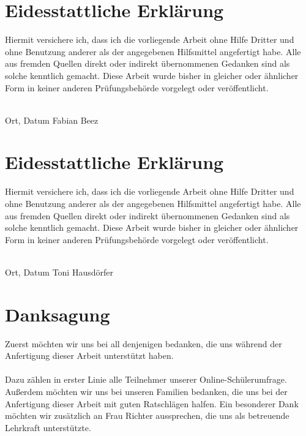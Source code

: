 \documentclass[a4paper, 12pt]{scrartcl}
\begin{document}
\newpage




\vspace*{4cm}
\section*{Eidesstattliche Erklärung}
\vfill
Hiermit versichere ich, dass ich die vorliegende Arbeit
ohne Hilfe Dritter und ohne Benutzung anderer als der angegebenen
Hilfsmittel angefertigt habe. Alle aus fremden Quellen direkt oder
indirekt übernommenen Gedanken sind als solche kenntlich gemacht. Diese
Arbeit wurde bisher in gleicher oder ähnlicher Form in keiner anderen
Prüfungsbehörde vorgelegt oder veröffentlicht.

\vfill
\noindent\dotfill\\
\hspace{2cm} Ort, Datum \hfill Fabian Beez
\vfill
\vfill\vfill\vfill\vfill\vfill
\newpage




\vspace*{4cm}
\section*{Eidesstattliche Erklärung}
\vfill
Hiermit versichere ich, dass ich die vorliegende Arbeit
ohne Hilfe Dritter und ohne Benutzung anderer als der angegebenen
Hilfsmittel angefertigt habe. Alle aus fremden Quellen direkt oder
indirekt übernommenen Gedanken sind als solche kenntlich gemacht. Diese
Arbeit wurde bisher in gleicher oder ähnlicher Form in keiner anderen
Prüfungsbehörde vorgelegt oder veröffentlicht.

\vfill
\noindent\dotfill\\
\hspace{2cm} Ort, Datum \hfill Toni Hausdörfer
\vfill
\vfill\vfill\vfill\vfill\vfill
\newpage






 
\vspace*{5cm}
\section*{Danksagung}
\vspace{1.7cm}
Zuerst möchten wir uns bei all denjenigen bedanken, die uns während der Anfertigung dieser Arbeit unterstützt haben. \\\\
Dazu zählen in erster Linie alle Teilnehmer unserer Online-Schülerumfrage. 
Außerdem möchten wir uns bei unseren Familien bedanken, die uns bei der Anfertigung dieser Arbeit mit guten Ratschlägen halfen.
Ein besonderer Dank möchten wir zusätzlich an Frau Richter aussprechen, die uns als betreuende Lehrkraft unterstützte.
\newpage
\end{document}
